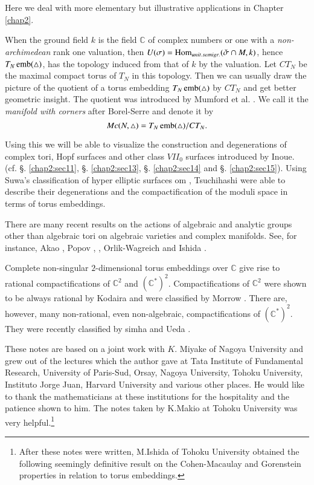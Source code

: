 Here we deal with more elementary but illustrative applications in
Chapter \ref{chap2}. 

When the ground field $k$ is the field $\mathbb{C}$ of complex numbers
or one with a \textit{non-archimedean} rank one valuation, then
$U(\sigma) = \Hom_{unit.semigr.}\break(\check{\sigma} \cap M, k) $, hence
$T_N \operatorname{emb} (\triangle)$, has the topology induced from that of $k$ by
the valuation. Let $CT_N$ be the maximal compact torus of $T_N$  in
this topology. Then we can usually draw the picture of the quotient of
a torus embedding $T_N \operatorname{emb} (\triangle)$ by $CT_N$ and get better
geometric insight. The quotient was introduced by Mumford et
al. \cite{keySC}. We call it the \textit{manifold with corners} after
Borel-Serre \cite{keyBS} and denote it by 
$$
Mc(N,\triangle) = T_N \operatorname{emb} (\triangle)/CT_N.
$$

Using this we will be able to visualize the construction and
degenerations of complex tori, Hopf surfaces and other class $VII_0$
surfaces introduced by Inoue. (cf. \S. \ref{chap2:sec11},
\S. \ref{chap2:sec13}, \S. \ref{chap2:sec14} and 
\S. \ref{chap2:sec15}). Using Suwa's classification of hyper elliptic surfaces om
\cite{keyS4}, Tsuchihashi \cite{keyT1} were able to describe their
degenerations and the compactification of the moduli space in terms of
torus embeddings. 

There are many recent results on the actions of algebraic and analytic
groups other than algebraic tori on algebraic varieties and complex
manifolds. See, for instance, Akao \cite{keyA1}, Popov \cite{keyP2},
\cite{keyP3}, Orlik-Wagreich \cite{keyOW} and Ishida \cite{keyI4}. 

Complete non-singular $2$-dimensional torus embeddings over
$\mathbb{C}$ give rise to rational compactifications of
$\mathbb{C}^2$ and $(\mathbb{C}^*)^2$. Compactifications of
$\mathbb{C}^2$ were shown to be always rational by Kodaira \cite{keyK4} and
were classified by Morrow \cite{keyM6}. There are, however, many
non-rational, even non-algebraic, compactifications of
$(\mathbb{C}^*)^2$. They were recently classified by simha \cite{keyS2} and
Ueda \cite{keyU1}. 

These notes are based on a joint work with $K$. Miyake of  Nagoya
University and grew out of the lectures which the author gave at Tata
Institute of Fundamental Research, University of Paris-Sud, Orsay,\break
Nagoya University, Tohoku University, Instituto Jorge Juan, Harvard
University and various other places. He would like to thank the
mathematicians at these institutions for the hospitality and the
patience shown to him. The notes taken by K.Makio at Tohoku University
was very helpful.\footnote{After these notes were written, M.Ishida of
  Tohoku University obtained the following seemingly definitive result
  on the Cohen-Macaulay and Gorenstein properties in relation to torus
  embeddings.} 

